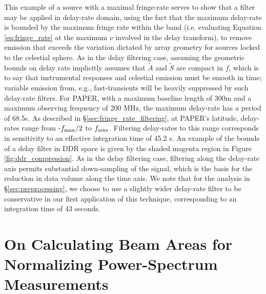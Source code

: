\documentclass[twocolumn,apj,numberedappendix]{emulateapj}
\def\At{\tilde{A}}
\begin{document}
This example of a source with a maximal fringe-rate serves to show that a 
filter may be applied in delay-rate domain, using the fact that the maximum
delay-rate is bounded by the maximum fringe rate within the band (i.e. evaluating Equation \ref{eq:fringe_rate}
at the maximum $\nu$ involved in the delay transform), to remove emission that exceeds the variation
dictated by array geometry for sources locked to the celestial sphere.  As in the delay filtering case, assuming
the geometric bounds on delay rate implicitly assumes that $\At$ and $\tilde{S}$ are compact in $f$, which
is to say that instrumental responses and celestial emission must be smooth in time; variable
emission from, e.g., fast-transients will be heavily suppressed by such delay-rate filters.
For PAPER, with a maximum baseline length of 300m and a maximum observing frequency of 200 MHz, 
the maximum delay-rate has a period of 68.5s.  As described in \S\ref{sec:fringe_rate_filtering}, at PAPER's
latitude, delay-rates range from -$f_{\rm max}/2$ to $f_{\rm max}$.  Filtering delay-rates to this
range corresponds in sensitivity to an effective integration time of 45.2 s.
An example of the bounds of a delay filter in DDR space is given
by the shaded magenta region in Figure \ref{fig:ddr_compression}.  As in the delay filtering case,
filtering along the delay-rate axis permits substantial down-sampling of the signal, which is
the basis for the reduction in data volume along the time axis.
We note that for the analysis
in \S\ref{sec:preprocessing}, we choose to use a slightly wider delay-rate filter to be conservative in
our first application of this technique, corresponding to an integration time of 43 seconds.

\section{On Calculating Beam Areas for Normalizing Power-Spectrum Measurements}
\label{app:beam_area}
\end{document}
